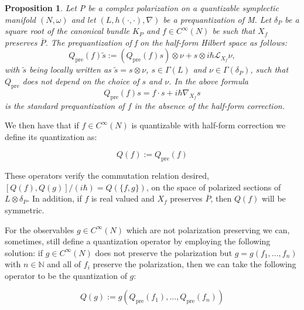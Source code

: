 \documentclass[a4paper,11pt]{article}
\newtheorem{proposition}{Proposition}
\begin{document}
\begin{proposition}
Let P be a complex polarization on a quantizable symplectic manifold $(N,\omega)$ and let $(L,h(\cdot,\cdot),\nabla)$ be a prequantization of M. Let $\delta_{P}$ be a square root of the canonical bundle $K_{P}$ and $f\in C^{\infty}(N)$ be such that $X_{f}$ preserves $\overline{P}$. The prequantization of f on the half-form Hilbert space as follows:
\begin{equation}
Q_{\mathrm{pre}}(f)\tilde{s} := (Q_{\mathrm{pre}}(f)s)\otimes \nu + s\otimes i\hbar\mathcal{L}_{X_{f}}\nu,
\label{eq:halfformcorrectionprequantumoperator}
\end{equation}
with $\tilde{s}$ being locally written as $\tilde{s} = s\otimes \nu$, $s\in\Gamma(L)$ and $\nu\in\Gamma(\delta_{P})$, such that $Q_{\mathrm{pre}}$ does not depend on the choice of $s$ and $\nu$. In the above formula
\begin{equation}
Q_{\mathrm{pre}}(f)s=f\cdot s+i\hbar \nabla_{X_f}s  
\end{equation}
is the standard prequantization of $f$ in the absence of the half-form correction.
\label{correctionprequantum}
\end{proposition}

We then have that if $f\in C^{\infty}(N)$ is quantizable with half-form correction we define its quantization as:

\begin{equation}
Q(f) := Q_{\mathrm{pre}}(f)   
\end{equation}

These operators verify the commutation relation desired, $[Q(f),Q(g)]/(i\hbar)=Q(\{f,g\})$, on the space of polarized sections of $L\otimes\delta_{P}$. In addition, if $f$ is real valued and $X_{f}$ preserves $\overline{P}$, then $Q(f)$ will be symmetric. 

For the observables $g\in C^{\infty}(N)$ which are not polarization preserving we can, sometimes, still define a quantization operator by employing the following solution: if $g\in C^{\infty}(N)$ does not preserve the polarization but $g=g(f_{1},...,f_{n})$ with $n\in\mathbb{N}$ and all of $f_{i}$ preserve the polarization, then we can take the following operator to be the quantization of $g$:

\begin{equation}
    Q(g) := g(Q_{\mathrm{pre}}(f_{1}),...,Q_{\mathrm{pre}}(f_{n})) 
    \label{multiplicativityquantization}
\end{equation}
\end{document}
